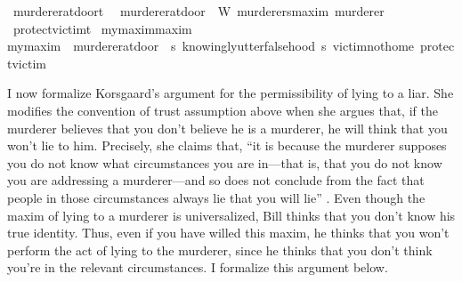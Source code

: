 \begin{isabellebody}
%
\isanewline
{}\isamarkupfalse%
\ murderer{\isacharunderscore}at{\isacharunderscore}door{\isacharcolon}{\isacharcolon}t\ \ \isanewline
{\isachardoublequoteopen}murderer{\isacharunderscore}at{\isacharunderscore}door\ {\isasymequiv}\ W\ murderers{\isacharunderscore}maxim\ murderer{\isachardoublequoteclose}\isanewline
%
\isanewline
{}\isamarkupfalse%
\ protect{\isacharunderscore}victim{\isacharcolon}{\isacharcolon}t\isanewline
%
\isanewline
{}\isamarkupfalse%
\ my{\isacharunderscore}maxim{\isacharcolon}{\isacharcolon}maxim\ \ \isanewline
{\isachardoublequoteopen}my{\isacharunderscore}maxim\ {\isasymequiv}\ {\isacharparenleft}murderer{\isacharunderscore}at{\isacharunderscore}door{\isacharcomma}\ \ {\isasymlambda}s{\isachardot}\ knowingly{\isacharunderscore}utter{\isacharunderscore}falsehood\ s\ victim{\isacharunderscore}not{\isacharunderscore}home{\isacharcomma}\ protect{\isacharunderscore}victim{\isacharparenright}{\isachardoublequoteclose}\isanewline
%
%
\isadelimproof
%
\endisadelimproof
%
\isatagproof
%
\endisatagproof
{\isafoldproof}%
%
\isadelimproof
%
\endisadelimproof
%
\begin{isamarkuptext}%
I now formalize Korsgaard's argument for the permissibility of lying to a liar. She modifies
the convention of trust assumption above when she argues that, if the murderer believes that you don't 
believe he is a murderer, he will think that you won't lie to him. Precisely, she claims that, 
``it is because the murderer supposes you do not know what circumstances you are in—that is, that 
you do not know you are addressing a murderer—and so does not conclude from the fact that people 
in those circumstances always lie that you will lie'' \cite[6]{KorsgaardRTL}. Even though the maxim of 
lying to a murderer is universalized, Bill thinks that you don't know his true identity. Thus,
even if you have willed this maxim, he thinks that you won't perform the act of lying to the murderer,
since he thinks that you don't think you're in the relevant circumstances. I formalize this argument below.%

\end{isamarkuptext}
\end{isabellebody}
